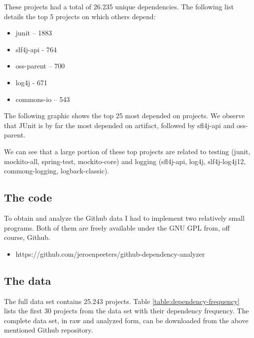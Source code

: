 These projects had a total of 26.235 unique dependencies. The following list details the top 5 projects on which others depend:

\begin{itemize}
	\item junit – 1883
	\item slf4j-api - 764
	\item oss-parent – 700
	\item log4j - 671
	\item commons-io – 543
\end{itemize}

The following graphic shows the top 25 most depended on projects. We observe that JUnit is by far the most depended on artifact, followed by sfl4j-api and oss-parent.

We can see that a large portion of these top projects are related to testing (junit, mockito-all, spring-test, mockito-core) and logging (sfl4j-api, log4j, slf4j-log4j12, commong-logging, logback-classic).

\subsection{The code}

To obtain and analyze the Github data I had to implement two relatively small programs. Both of them are freely available under the GNU GPL from, off course, Github.

\begin{itemize}
	\item https://github.com/jeroenpeeters/github-dependency-analyzer
\end{itemize}

\subsection{The data}

The full data set contains 25.243 projects. Table \ref{table:dependency-frequency} lists the first 30 projects from the data set with their dependency frequency.
The complete data set, in raw and analyzed form, can be downloaded from the above mentioned Github repository. 

